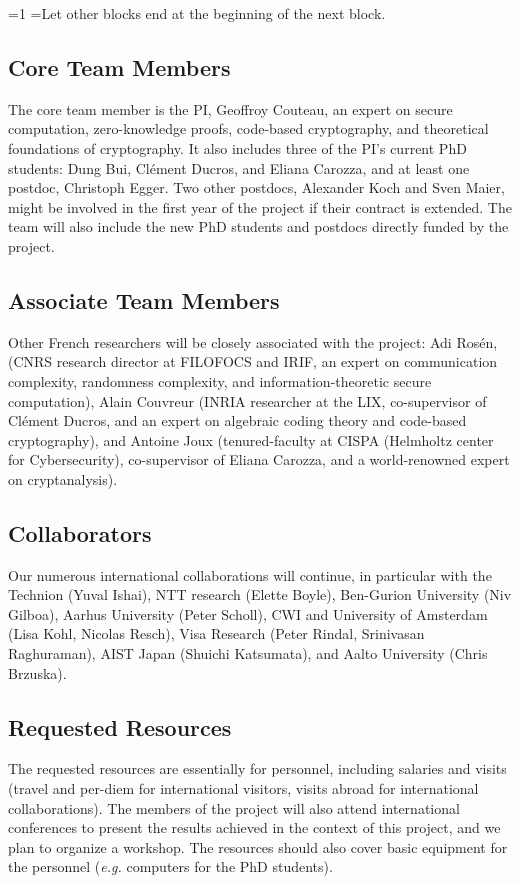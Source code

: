 \documentclass[oneside, a4paper, onecolumn, 11pt]{article}
\newcounter{alphasect}
\def\alphainsection{0}
\newenvironment{alphasection}{%
  \ifnum\alphainsection=1%
    \errhelp={Let other blocks end at the beginning of the next block.}
    \errmessage{Nested Alpha section not allowed}
  \fi%
  \setcounter{alphasect}{0}
  \def\alphainsection{1}
}{%
  \setcounter{alphasect}{0}
  \def\alphainsection{0}
}%
\begin{document}
\begin{alphasection}
\subsection{Core Team Members}

The core team member is the PI, Geoffroy Couteau, an expert on secure computation, zero-knowledge proofs, code-based cryptography, and theoretical foundations of cryptography. It also includes three of the PI's current PhD students: Dung Bui, Clément Ducros, and Eliana Carozza, and at least one postdoc, Christoph Egger. Two other postdocs, Alexander Koch and Sven Maier, might be involved in the first year of the project if their contract is extended. The team will also include the new PhD students and postdocs directly funded by the project.

\subsection{Associate Team Members}

Other French researchers will be closely associated with the project: Adi Rosén, (CNRS research director at FILOFOCS and IRIF, an expert on communication complexity, randomness complexity, and information-theoretic secure computation), Alain Couvreur (INRIA researcher at the LIX, co-supervisor of Clément Ducros, and an expert on algebraic coding theory and code-based cryptography), and Antoine Joux (tenured-faculty at CISPA (Helmholtz center for Cybersecurity), co-supervisor of Eliana Carozza, and a world-renowned expert on cryptanalysis).

\subsection{Collaborators}

Our numerous international collaborations will continue, in particular with the Technion (Yuval Ishai), NTT research (Elette Boyle), Ben-Gurion University (Niv Gilboa), Aarhus University (Peter Scholl), CWI and University of Amsterdam (Lisa Kohl, Nicolas Resch), Visa Research (Peter Rindal, Srinivasan Raghuraman), AIST Japan (Shuichi Katsumata), and Aalto University (Chris Brzuska).

\subsection{Requested Resources}

The requested resources are essentially for personnel, including salaries and visits (travel and per-diem for international visitors, visits abroad for international collaborations). The members of the project will also attend international conferences to present the results achieved in the context of this project, and we plan to organize a workshop. The resources should also cover basic equipment for the personnel (\emph{e.g.} computers for the PhD students).


\end{alphasection}
\end{document}
